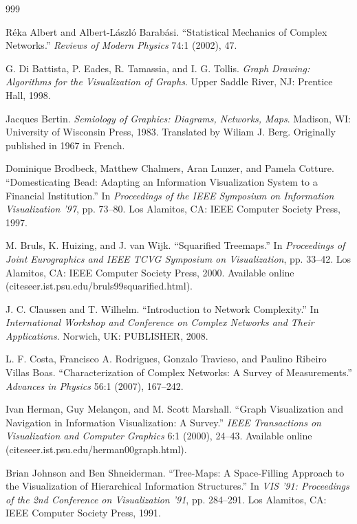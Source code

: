 \documentclass[12pt,a4paper, openany]{book}
\begin{document}
\begin{thebibliography}{999}
\singlespacing
\setlength{\itemsep}{7pt}

Réka Albert and Albert-László Barabási. “Statistical Mechanics of Complex Networks.” \textit{Reviews of Modern Physics} 74:1 (2002), 47.

G. Di Battista, P. Eades, R. Tamassia, and I. G. Tollis. \textit{Graph Drawing: Algorithms for the Visualization of Graphs}. Upper Saddle River, NJ: Prentice Hall, 1998.

Jacques Bertin. \textit{Semiology of Graphics: Diagrams, Networks, Maps}. Madison, WI: University of Wisconsin Press, 1983. Translated by Wiliam J. Berg. Originally published in 1967 in French.

Dominique Brodbeck, Matthew Chalmers, Aran Lunzer, and Pamela Cotture. “Domesticating Bead: Adapting an Information Visualization System to a Financial Institution.” In \textit{Proceedings of the IEEE Symposium on Information Visualization '97}, pp. 73--80. Los Alamitos, CA: IEEE Computer Society Press, 1997.

M. Bruls, K. Huizing, and J. van Wijk. “Squarified Treemaps.” In \textit{Proceedings of Joint Eurographics and IEEE TCVG Symposium on Visualization}, pp. 33--42. Los Alamitos, CA: IEEE Computer Society Press, 2000. Available online (citeseer.ist.psu.edu/bruls99squarified.html).

J. C. Claussen and T. Wilhelm. “Introduction to Network Complexity.” In \textit{International Workshop and Conference on Complex Networks and Their Applications}. Norwich, UK: PUBLISHER, 2008.

L. F. Costa, Francisco A. Rodrigues, Gonzalo Travieso, and Paulino Ribeiro Villas Boas. “Characterization of Complex Networks: A Survey of Measurements.” \textit{Advances in Physics} 56:1 (2007), 167--242.

Ivan Herman, Guy Melançon, and M. Scott Marshall. “Graph Visualization and Navigation in Information Visualization: A Survey.” \textit{IEEE Transactions on Visualization and Computer Graphics} 6:1 (2000), 24--43. Available online (citeseer.ist.psu.edu/herman00graph.html).

Brian Johnson and Ben Shneiderman. “Tree-Maps: A Space-Filling Approach to the Visualization of Hierarchical Information Structures.” In \textit{VIS '91: Proceedings of the 2nd Conference on Visualization '91}, pp. 284--291. Los Alamitos, CA: IEEE Computer Society Press, 1991.


\end{thebibliography}
\end{document}
